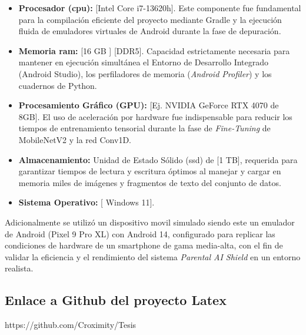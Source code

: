\begin{itemize}
    \item \textbf{Procesador (\gls{cpu}):} [Intel Core i7-13620h]. Este componente fue fundamental para la compilación eficiente del proyecto mediante Gradle y la ejecución fluida de emuladores virtuales de Android durante la fase de depuración.
    \item \textbf{Memoria \gls{ram}:} [16 GB ] [DDR5]. Capacidad estrictamente necesaria para mantener en ejecución simultánea el Entorno de Desarrollo Integrado (Android Studio), los perfiladores de memoria (\textit{Android Profiler}) y los cuadernos de Python.
    \item \textbf{Procesamiento Gráfico (GPU):} [Ej. NVIDIA GeForce RTX 4070 de 8GB]. El uso de aceleración por hardware fue indispensable para reducir los tiempos de entrenamiento tensorial durante la fase de \textit{Fine-Tuning} de MobileNetV2 y la red Conv1D.
    \item \textbf{Almacenamiento:} Unidad de Estado Sólido (\gls{ssd}) de [1 TB], requerida para garantizar tiempos de lectura y escritura óptimos al manejar y cargar en memoria miles de imágenes y fragmentos de texto del conjunto de datos.
    \item \textbf{Sistema Operativo:} [ Windows 11].
\end{itemize}

Adicionalmente se utilizó un dispositivo movil simulado siendo este un emulador de Android (Pixel 9 Pro XL) con Android 14, configurado para replicar las condiciones de hardware de un smartphone de gama media-alta, con el fin de validar la eficiencia y el rendimiento del sistema \textit{Parental AI Shield} en un entorno realista.

\subsection{Enlace a Github del proyecto Latex}
https://github.com/Croximity/Tesis
